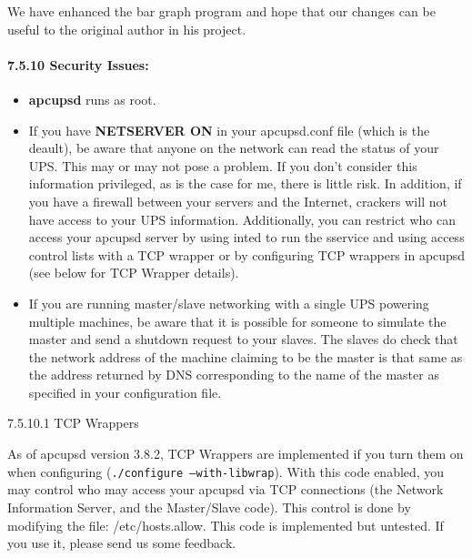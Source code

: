We have enhanced the bar graph program and hope that our changes can be useful
to the original author in his project. 

\label{Security-Issues}

\paragraph*{7.5.10 Security Issues:}

\begin{itemize}
\item {\bf apcupsd} runs as root.  
\item If you have {\bf NETSERVER ON} in your apcupsd.conf file (which is the
deault), be aware that anyone on the network can read the status of your UPS. 
This may or may not pose a problem. If you don't consider this information
privileged, as is the case for me, there is little risk. In addition, if you
have a firewall between your servers and the Internet, crackers will not have
access to your UPS information.  Additionally, you can restrict who can access
your apcupsd server by using inted to run the sservice and using access
control lists with a TCP wrapper or by configuring TCP wrappers in apcupsd
(see below for TCP Wrapper details).  
\item If you are running master/slave networking with a single UPS powering
multiple machines, be aware that it is possible for someone to simulate the
master and send a shutdown request to your slaves. The slaves do check that
the network address of the machine claiming to be the master is that same as
the address returned by DNS corresponding to the name of the master as
specified in your configuration file. 
\end{itemize}

\label{TCP-Wrappers}

{\small7.5.10.1 TCP Wrappers}

\label{index-Wrappers_002c-TCP-138}
\label{index-TCP-wrappers-139}
As of apcupsd version 3.8.2, TCP Wrappers are implemented if you turn them on
when configuring ({\tt ./configure --with-libwrap}).  With this code enabled,
you may control who may access your apcupsd via TCP connections (the Network
Information Server, and the Master/Slave code). This control is done by
modifying the file: /etc/hosts.allow. This code is implemented but untested.
If you use it, please send us some feedback. 

